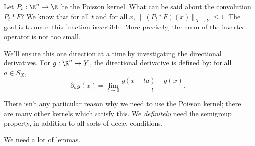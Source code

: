 

Let $P_t: \R^n \to \R$ be the Poisson kernel. What can be said about the convolution $P_t * F$? We know that for all $t$ and for all $x$, $\|(P_t * F)(x)\|_{X \to Y} \le 1$. The goal is to make this function invertible. More precisely, the norm of the inverted operator is not too small. 

We'll ensure this one direction at a time by investigating the directional derivatives. For $g: \R^n \to Y$, the directional derivative is defined by: for all $a \in S_X$, \[\partial_a g(x) = \lim_{t \to 0} \frac{g(x + ta) - g(x)}{t}.\]

There isn't any particular reason why we need to use the Poisson kernel; there are many other kernels which satisfy this. We \emph{definitely} need the semigroup property, in addition to all sorts of decay conditions. 

We need a lot of lemmas.

%
%
%

